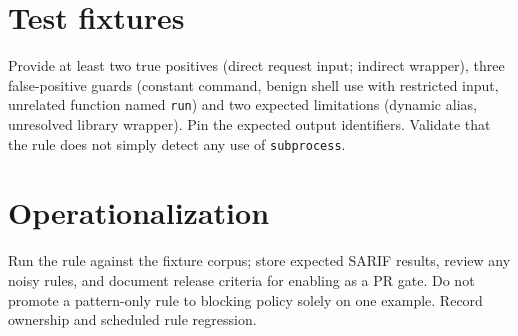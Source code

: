 \documentclass[10pt,letterpaper]{article}
\begin{document}
\section{Test fixtures}
Provide at least two true positives (direct request input; indirect wrapper), three false-positive guards (constant command, benign shell use with restricted input, unrelated function named \texttt{run}) and two expected limitations (dynamic alias, unresolved library wrapper). Pin the expected output identifiers. Validate that the rule does not simply detect any use of \texttt{subprocess}.
\section{Operationalization}
Run the rule against the fixture corpus; store expected SARIF results, review any noisy rules, and document release criteria for enabling as a PR gate. Do not promote a pattern-only rule to blocking policy solely on one example. Record ownership and scheduled rule regression.
\end{document}

